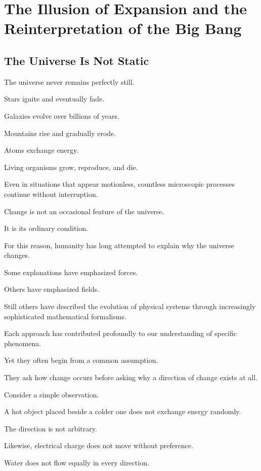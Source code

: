 

\section{The Illusion of Expansion and the Reinterpretation of the Big Bang}

\subsection*{\textbf{The Universe Is Not Static}}


The universe never remains perfectly still.

Stars ignite and eventually fade.

Galaxies evolve over billions of years.

Mountains rise and gradually erode.

Atoms exchange energy.

Living organisms grow, reproduce, and die.

Even in situations that appear motionless, countless microscopic processes continue without interruption.

Change is not an occasional feature of the universe.

It is its ordinary condition.

For this reason, humanity has long attempted to explain why the universe changes.

Some explanations have emphasized forces.

Others have emphasized fields.

Still others have described the evolution of physical systems through increasingly sophisticated mathematical formalisms.

Each approach has contributed profoundly to our understanding of specific phenomena.

Yet they often begin from a common assumption.

They ask how change occurs before asking why a direction of change exists at all.

Consider a simple observation.

A hot object placed beside a colder one does not exchange energy randomly.

The direction is not arbitrary.

Likewise, electrical charge does not move without preference.

Water does not flow equally in every direction.

